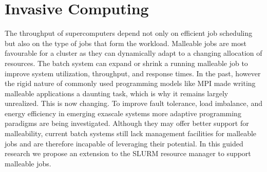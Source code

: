 \documentclass[a4paper, 12pt]{article}
\begin{document}
\newpage
\section{Invasive Computing}
The throughput of supercomputers depend not only on efficient job scheduling but also on the type of jobs that form the workload. Malleable jobs are most favourable for a cluster as they can dynamically adapt to a changing allocation of resources. The batch system can expand or shrink a running malleable job to improve system utilization, throughput, and response times. In the past, however the rigid nature of commonly used programming models like MPI made writing malleable applications a daunting task, which is why it remains largely unrealized. This is now changing. To improve fault tolerance, load imbalance, and energy efficiency in emerging exascale systems more adaptive programming paradigms are being investigated. Although they may offer better support for malleability, current batch systems still lack management facilities for malleable jobs and are therefore incapable of leveraging their potential. In this guided research we propose an extension to the SLURM resource manager to support malleable jobs.
\end{document}
